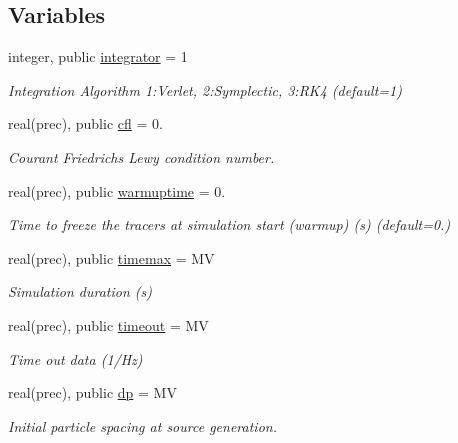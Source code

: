 \subsection*{Variables}
\begin{DoxyCompactItemize}
\item 
integer, public \mbox{\hyperlink{namespacesimulation__globals_a56eb8ca9469c8bc172fa289bee344a85}{integrator}} = 1
\begin{DoxyCompactList}\small\item\em Integration Algorithm 1\+:Verlet, 2\+:Symplectic, 3\+:R\+K4 (default=1) \end{DoxyCompactList}\item 
real(prec), public \mbox{\hyperlink{namespacesimulation__globals_ab022711051f6c5905fa22f5f715d0efb}{cfl}} = 0.
\begin{DoxyCompactList}\small\item\em Courant Friedrichs Lewy condition number. \end{DoxyCompactList}\item 
real(prec), public \mbox{\hyperlink{namespacesimulation__globals_a1be81c2d5db4400cd1a9a1c4e25728d2}{warmuptime}} = 0.
\begin{DoxyCompactList}\small\item\em Time to freeze the tracers at simulation start (warmup) (s) (default=0.) \end{DoxyCompactList}\item 
real(prec), public \mbox{\hyperlink{namespacesimulation__globals_aca61ad35c1c57ca41152ce3707d412e3}{timemax}} = MV
\begin{DoxyCompactList}\small\item\em Simulation duration (s) \end{DoxyCompactList}\item 
real(prec), public \mbox{\hyperlink{namespacesimulation__globals_ac867a68f020b7352cd68bbe996cfdf24}{timeout}} = MV
\begin{DoxyCompactList}\small\item\em Time out data (1/\+Hz) \end{DoxyCompactList}\item 
real(prec), public \mbox{\hyperlink{namespacesimulation__globals_ad8772390891d3fa9d701db0fc341a1ab}{dp}} = MV
\begin{DoxyCompactList}\small\item\em Initial particle spacing at source generation. \end{DoxyCompactList}\item 

\end{DoxyCompactItemize}
